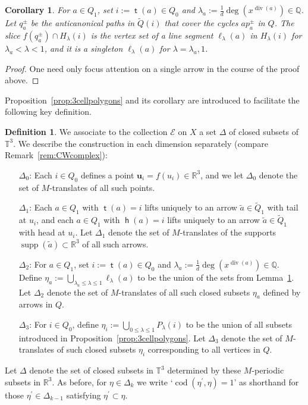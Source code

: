 \documentclass[11pt,a4paper]{amsart}
\numberwithin{equation}{section}
\newtheorem{corollary}[theorem]{Corollary}
\theoremstyle{definition}
\newtheorem{definition}[theorem]{Definition}
\theoremstyle{remark}
\newcommand{\QQ}{\ensuremath{\mathbb{Q}}}
\newcommand{\RR}{\ensuremath{\mathbb{R}}}
\newcommand{\codim}{\operatorname{cod}}
\renewcommand{\div}{\operatorname{div}}
\newcommand{\head}{\operatorname{\mathsf{h}}}
\newcommand{\supp}{\operatorname{supp}}
\newcommand{\tail}{\operatorname{\mathsf{t}}}
\begin{document}
 
 \begin{corollary}
 \label{lem:2-celllinesegments}
 For $a\in Q_1$, set $i:=\tail(a)\in Q_0$ and $\lambda_a:= \frac{1}{d}\deg(x^{\div(a)})\in \QQ$. Let $q_a^\pm$ be the anticanonical paths in $\widetilde{Q}(i)$ that cover the cycles $ap_a^\pm$ in $Q$. The slice $f(q_a^\pm)\cap H_\lambda(i)$ is the vertex set of a line segment $\ell_{\lambda}(a)$ in $H_\lambda(i)$ for $\lambda_a<\lambda < 1$, and it is a singleton $\ell_\lambda(a)$ for $\lambda=\lambda_a, 1$.
   \end{corollary}
   \begin{proof}
One need only focus attention on a single arrow in the course of the proof above.
    \end{proof}
   
 Proposition~\ref{prop:3cellpolygons} and its corollary are introduced to facilitate the following key definition. 

\begin{definition}
\label{def:cellcomplex}
 We associate to the collection $\mathscr{E}$ on $X$ a set $\Delta$ of closed subsets of $\mathbb{T}^3$. We describe the construction in each dimension separately (compare Remark~\ref{rem:CWcomplex}): 
 \begin{enumerate}
 \item[$\Delta_0$:] Each $i\in Q_0$ defines a point $\mathbf{u}_i=f(u_i)\in \RR^3$, and we let $\Delta_0$ denote the set of $M$-translates of all such points. 
  \item[$\Delta_1$:] Each $a\in Q_1$ with $\tail(a)=i$ lifts uniquely to an arrow $\widetilde{a}\in \widetilde{Q}_1$ with tail at $u_i$, and each $a\in Q_1$ with $\head(a)=i$ lifts uniquely to an arrow $\widetilde{a}\in \widetilde{Q}_1$ with head at $u_i$. Let $\Delta_1$ denote the set of  $M$-translates of the supports $\supp(\widetilde{a})\subset \RR^3$ of all such arrows.
    \item[$\Delta_2$:] For $a\in Q_1$, set $i:=\tail(a)\in Q_0$ and $\lambda_a:= \frac{1}{d}\deg(x^{\div(a)})\in \QQ$. Define $\eta_a:= \bigcup_{\lambda_a\leq \lambda\leq 1}\ell_{\lambda}(a)$ to be the union of the sets from Lemma~\ref{lem:2-celllinesegments}. Let $\Delta_2$ denote the set of $M$-translates of all such closed subsets $\eta_a$ defined by arrows in $Q$.
   \item[$\Delta_3$:] For $i\in Q_0$, define $\eta_i:= \bigcup_{0\leq \lambda\leq 1} P_{\lambda}(i)$ to be the union of all subsets introduced in Proposition~\ref{prop:3cellpolygons}. Let $\Delta_3$ denote the set of $M$-translates of such closed subsets $\eta_i$ corresponding to all vertices in $Q$.
  \end{enumerate}
Let $\Delta$ denote the set of closed subsets in $\mathbb{T}^3$ determined by these $M$-periodic subsets in $\RR^3$. As before, for $\eta\in \Delta_k$ we write `$\codim(\eta^\prime, \eta)=1$' as shorthand for those $\eta^\prime\in \Delta_{k-1}$ satisfying $\eta^\prime\subset \eta$.
\end{definition}
\end{document}
